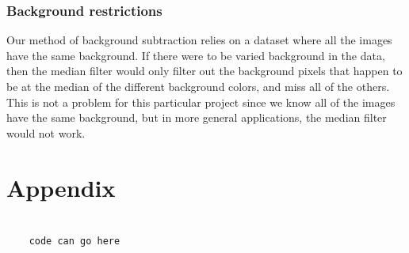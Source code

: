 \documentclass[12pt]{article}
\begin{document}
\subsubsection{Background restrictions}

Our method of background subtraction relies on a dataset where all the images have the same background. If there were to be varied background in the data, then the median filter would only filter out the background pixels that happen to be at the median of the different background colors, and miss all of the others. This is not a problem for this particular project since we know all of the images have the same background, but in more general applications, the median filter would not work.

\section*{Appendix}

\begin{verbatim}
	
	code can go here
	
\end{verbatim}
\end{document}
